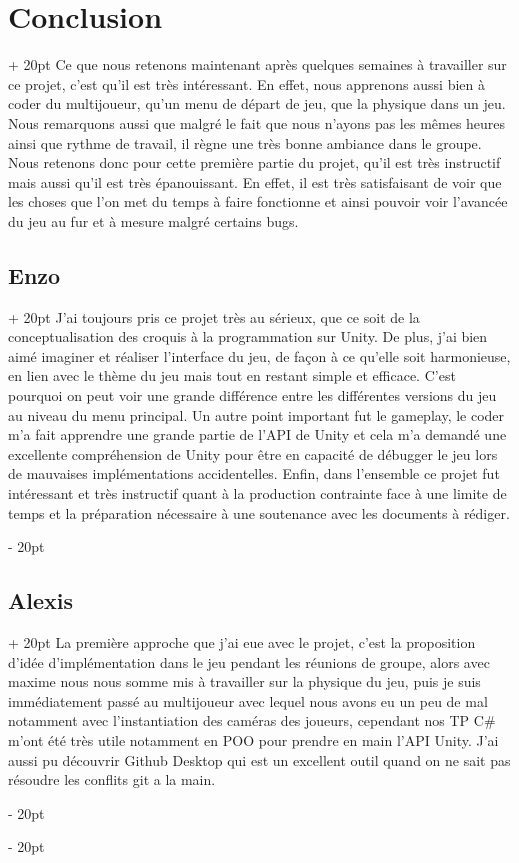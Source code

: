 \documentclass[a4paper, 12pt, twoside]{article}
\newcommand{\ind}[1][20pt]{\advance\leftskip + #1}
\newcommand{\deind}[1][20pt]{\advance\leftskip - #1}
\newenvironment{indt}[2][20pt]{#2 \par \ind[#1]}{\par \deind} %
\begin{document}
    \begin{indt}{\section{Conclusion}}
        Ce que nous retenons maintenant après quelques semaines à travailler sur ce projet, c'est qu'il est très intéressant. En effet, nous apprenons aussi bien à coder du multijoueur, qu'un menu de départ de jeu, que la physique dans un jeu.  Nous remarquons aussi que malgré le fait que nous n'ayons pas les mêmes heures ainsi que rythme de travail, il règne une très bonne ambiance dans le groupe. Nous retenons donc pour cette première partie du projet, qu'il est très instructif mais aussi qu'il est très épanouissant. En effet, il est très satisfaisant de voir que les choses que l'on met du temps à faire fonctionne et ainsi pouvoir voir l'avancée du jeu au fur et à mesure malgré certains bugs.

        \begin{indt}{\subsection{Enzo}}
            J'ai toujours pris ce projet très au sérieux, que ce soit de la conceptualisation des croquis à la programmation sur Unity. De plus, j'ai bien aimé imaginer et réaliser l'interface du jeu, de façon à ce qu'elle soit harmonieuse, en lien avec le thème du jeu mais tout en restant simple et efficace. C'est pourquoi on peut voir une grande différence entre les différentes versions du jeu au niveau du menu principal. Un autre point important fut le gameplay, le coder m'a fait apprendre une grande partie de l'API de Unity et cela m'a demandé une excellente compréhension de Unity pour être en capacité de débugger le jeu lors de mauvaises implémentations accidentelles. Enfin, dans l'ensemble ce projet fut intéressant et très instructif quant à la production contrainte face à une limite de temps et la préparation nécessaire à une soutenance avec les documents à rédiger.
        \end{indt}
        
        \begin{indt}{\subsection{Alexis}}
            La première approche que j'ai eue avec le projet, c'est la proposition d'idée d'implémentation dans le jeu pendant les réunions de groupe, alors avec maxime nous nous somme mis à travailler sur la physique du jeu, puis je suis immédiatement passé au multijoueur avec lequel nous avons eu un peu de mal notamment avec l'instantiation des caméras des joueurs, cependant nos TP C$\#$ m'ont été très utile notamment en POO pour prendre en main l'API Unity. J'ai aussi pu découvrir Github Desktop qui est un excellent outil quand on ne sait pas résoudre les conflits git a la main.
        \end{indt}


\end{indt}
\end{document}
